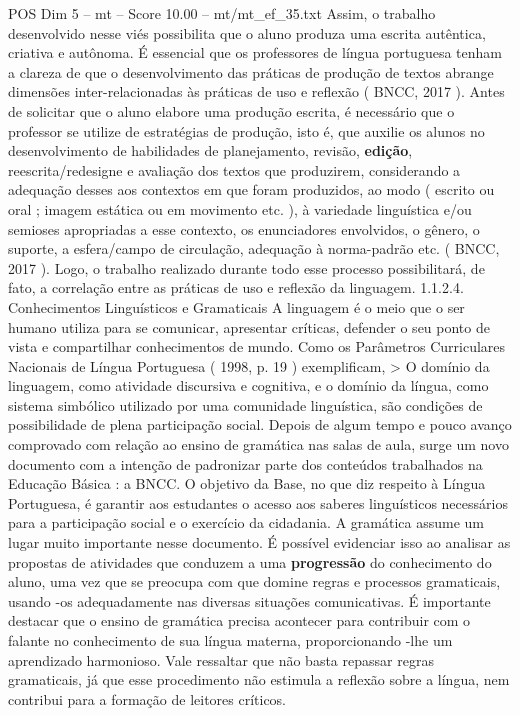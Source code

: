 \begin{textsample}{POS Dim 5 – mt – Score 10.00 – mt/mt\_ef\_35.txt}
Assim, o trabalho desenvolvido nesse viés possibilita que o aluno produza uma escrita autêntica, criativa e autônoma.
É essencial que os professores de língua portuguesa tenham a clareza de que o desenvolvimento das práticas de produção de textos abrange dimensões inter-relacionadas às práticas de uso e reflexão ( BNCC, 2017 ).
Antes de solicitar que o aluno elabore uma produção escrita, é necessário que o professor se utilize de estratégias de produção, isto é, que auxilie os alunos no desenvolvimento de habilidades de planejamento, revisão, \textbf{edição}, reescrita/redesigne e avaliação dos textos que produzirem, considerando a adequação desses aos contextos em que foram produzidos, ao modo ( escrito ou oral ; imagem estática ou em movimento etc. ), à variedade linguística e/ou semioses apropriadas a esse contexto, os enunciadores envolvidos, o gênero, o suporte, a esfera/campo de circulação, adequação à norma-padrão etc. ( BNCC, 2017 ).
Logo, o trabalho realizado durante todo esse processo possibilitará, de fato, a correlação entre as práticas de uso e reflexão da linguagem. 1.1.2.4.
Conhecimentos Linguísticos e Gramaticais A linguagem é o meio que o ser humano utiliza para se comunicar, apresentar críticas, defender o seu ponto de vista e compartilhar conhecimentos de mundo.
Como os Parâmetros Curriculares Nacionais de Língua Portuguesa ( 1998, p. 19 ) exemplificam, > O domínio da linguagem, como atividade discursiva e cognitiva, e o domínio da língua, como sistema simbólico utilizado por uma comunidade linguística, são condições de possibilidade de plena participação social.
Depois de algum tempo e pouco avanço comprovado com relação ao ensino de gramática nas salas de aula, surge um novo documento com a intenção de padronizar parte dos conteúdos trabalhados na Educação Básica : a BNCC.
O objetivo da Base, no que diz respeito à Língua Portuguesa, é garantir aos estudantes o acesso aos saberes linguísticos necessários para a participação social e o exercício da cidadania.
A gramática assume um lugar muito importante nesse documento.
É possível evidenciar isso ao analisar as propostas de atividades que conduzem a uma \textbf{progressão} do conhecimento do aluno, uma vez que se preocupa com que domine regras e processos gramaticais, usando -os adequadamente nas diversas situações comunicativas.
É importante destacar que o ensino de gramática precisa acontecer para contribuir com o falante no conhecimento de sua língua materna, proporcionando -lhe um aprendizado harmonioso.
Vale ressaltar que não basta repassar regras gramaticais, já que esse procedimento não estimula a reflexão sobre a língua, nem contribui para a formação de leitores críticos.

\end{textsample}
